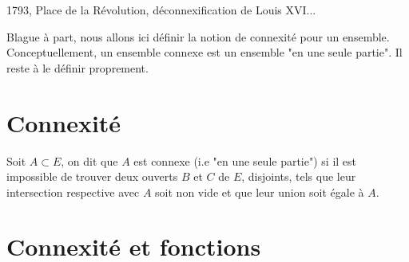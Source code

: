 
1793, Place de la Révolution, déconnexification de Louis XVI... 

\vspace{0.3cm}

Blague à part, nous allons ici définir la notion de connexité pour un ensemble. 
Conceptuellement, un ensemble connexe est un ensemble "en une seule partie". 
Il reste à le définir proprement. 


\section{Connexité}

\begin{definition}[Connexité]
    Soit $A \subset E$, on dit que $A$ est connexe (i.e "en une seule partie") si il est impossible de trouver 
    deux ouverts $B$ et $C$ de $E$, disjoints, tels que leur intersection respective avec $A$ soit non vide 
    et que leur union soit égale à $A$. 
\end{definition}






\section{Connexité et fonctions}
